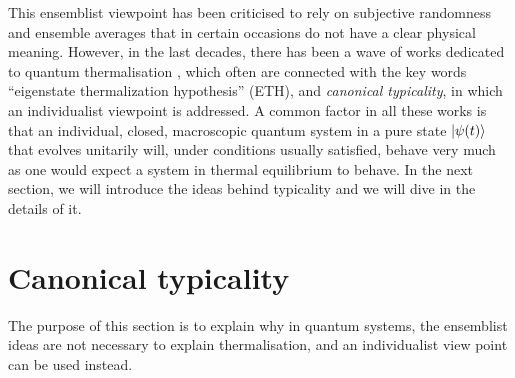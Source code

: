 \indent This ensemblist viewpoint has been criticised \cite{mccrea_1939, TERHAAR1995216, goldstein_gibbs_2020, goldstein_boltzmanns_2001} to rely on subjective randomness and ensemble averages that in certain occasions do not have a clear physical meaning. However, in the last decades, there has been a wave of works dedicated to quantum thermalisation \cite{popescu_foundations_2005, goldstein_canonical_2006, gemmer_thermalization_2006, popescu_entanglement_2006, goldstein_approach_2010, kaufman_quantum_2016, gogolin_equilibration_2016 }, which often are connected with the key words “eigenstate thermalization hypothesis” (ETH), and \textit{canonical typicality}, in which an individualist viewpoint is addressed. A common factor in all these works is that an individual, closed, macroscopic quantum system in a pure state $\mathinner{|{\psi(t)}\rangle}$ that evolves unitarily will, under conditions usually satisfied, behave very much as one would expect a system in thermal equilibrium to behave. In the next section, we will introduce the ideas behind typicality and we will dive in the details of it.


\section{Canonical typicality}

The purpose of this section is to explain why in quantum systems, the ensemblist ideas are not necessary to explain thermalisation, and an individualist view point can be used instead.\\

